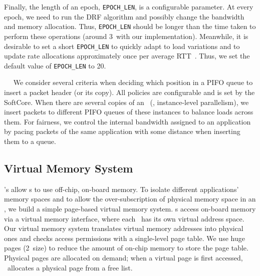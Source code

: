 Finally, the length of an epoch, \texttt{EPOCH\_LEN}, is a configurable parameter.
At every epoch, we need to run the DRF algorithm and possibly change the bandwidth and memory allocation.
Thus, \texttt{EPOCH\_LEN} should be longer than the time taken to perform these operations (around 3\mus\ with our implementation).
Meanwhile, it is desirable to set a short \texttt{EPOCH\_LEN} to quickly adapt to load variations and to update rate allocations approximately once per average RTT~\cite{xcp-sigcomm02, rcp-sigcomm06}.
Thus, we set the default value of \texttt{EPOCH\_LEN} to 20\mus.



~~
We consider several criteria when deciding which position in a PIFO queue to insert a packet header (or its copy).
All policies are configurable and is set by the SoftCore.
When there are several copies of an \nt\ (\ie, instance-level parallelism), we insert packets to different PIFO queues of these instances to balance loads across them.
For fairness, we control the internal bandwidth assigned to an application by pacing packets of the same application with some distance when inserting them to a queue.
\fi

\subsection{Virtual Memory System}
\label{sec:memory}
\snic's allow \nt{}s to use off-chip, on-board memory.
To isolate different applications' memory spaces and to allow the over-subscription of physical memory space in an \snic, we build a simple page-based virtual memory system.
\nt{}s access on-board memory via a virtual memory interface,
where each \nt\ has its own virtual address space.
Our virtual memory system translates virtual memory addresses into physical ones and checks access permissions with a single-level page table.
We use huge pages (2\MB\ size) to reduce the amount of on-chip memory to store the page table.
Physical pages are allocated on demand; when a virtual page is first accessed, \snic\ allocates a physical page from a free list.

